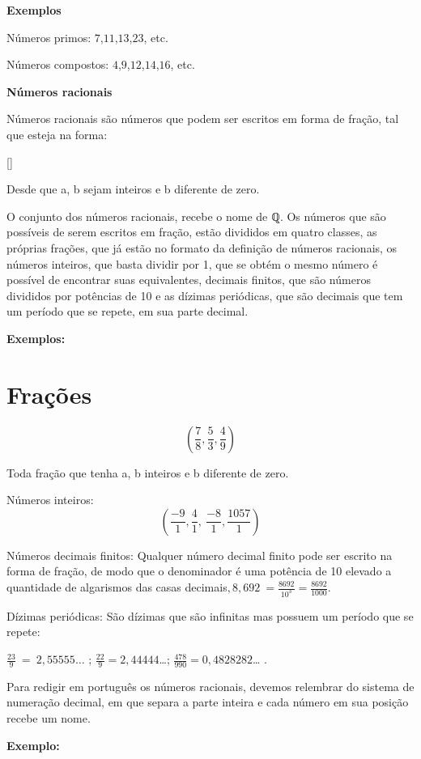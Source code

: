 \textbf{Exemplos}

Números primos: $7$,$11$,$13$,$23$, etc.

Números compostos: $4$,$9$,$12$,$14$,$16$, etc.

\textbf{Números racionais}

Números racionais são números que podem ser escritos em forma de fração,
tal que esteja na forma:

[]

Desde que a, b sejam inteiros e b diferente de zero.

O conjunto dos números racionais, recebe o nome de ℚ. Os números que são
possíveis de serem escritos em fração, estão divididos em quatro
classes, as próprias frações, que já estão no formato da definição de
números racionais, os números inteiros, que basta dividir por 1, que se
obtém o mesmo número é possível de encontrar suas equivalentes, decimais
finitos, que são números divididos por potências de 10 e as dízimas
periódicas, que são decimais que tem um período que se repete, em sua
parte decimal.

\textbf{Exemplos:}

\section{Frações}

$$(\frac{7}{8},\frac{5}{3},\frac{4}{9})$$

Toda fração que tenha a,
b inteiros e b diferente de zero.

Números inteiros:
$$(\frac{-9}{1},\frac{4}{1},\  \frac{-8}{1},\frac{1057}{1})$$

Números decimais finitos: Qualquer número decimal finito pode ser
escrito na forma de fração, de modo que o denominador é uma potência de
10 elevado a quantidade de algarismos das casas
decimais\(,8,692\  = \frac{8692}{10^{3}} = \frac{8692}{1000}\).

Dízimas periódicas: São dízimas que são infinitas mas possuem um período
que se repete: 


\(\frac{23}{9}\  = \ 2,55555\ldots\) ;
\(\frac{22}{9} = 2,44444\)\ldots;
\(\frac{478}{990} = 0,4828282\)\ldots{} .


Para redigir em português os números racionais, devemos relembrar do
sistema de numeração decimal, em que separa a parte inteira e cada
número em sua posição recebe um nome.~

\textbf{Exemplo:}

